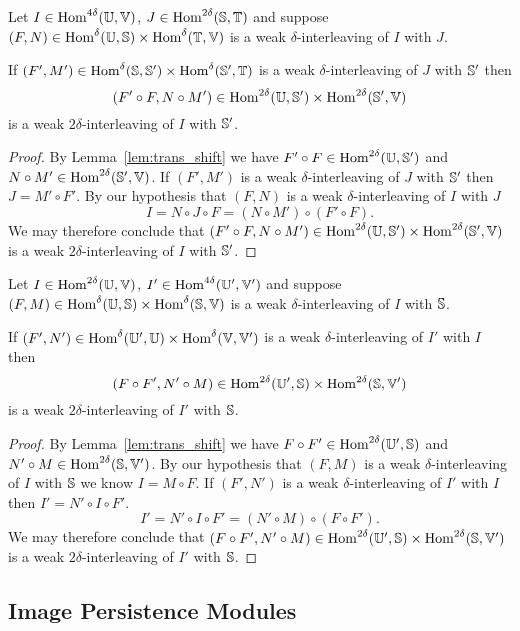 \begin{lemma}\label{lem:left}
  Let $I\in\Hom^{4\delta}(\U,\V)$, $J\in\Hom^{2\delta}(\S,\T)$ and suppose $(F, N)\in\Hom^{\delta}(\U,\S)\times\Hom^\delta(\T,\V)$ is a weak $\delta$-interleaving of $I$ with $J$.

  If $(F', M')\in\Hom^\delta(\S,\S')\times\Hom^\delta(\S',\T)$ is a weak $\delta$-interleaving of $J$ with $\S'$ then
  \[(F'\circ F, N\circ M')\in\Hom^{2\delta}(\U,\S')\times \Hom^{2\delta}(\S',\V)\]
  is a weak $2\delta$-interleaving of $I$ with $\S'$.
\end{lemma}
\begin{proof}
  By Lemma~\ref{lem:trans_shift} we have $F'\circ F\in\Hom^{2\delta}(\U,\S')$ and $N\circ M'\in \Hom^{2\delta}(\S',\V)$.
  If $(F', M')$ is a weak $\delta$-interleaving of $J$ with $\S'$ then $J = M'\circ F'$.
  By our hypothesis that $(F, N)$ is a weak $\delta$-interleaving of $I$ with $J$
  \[ I = N\circ J\circ F = (N\circ M')\circ (F'\circ F).\]
  We may therefore conclude that $(F'\circ F, N\circ M')\in\Hom^{2\delta}(\U,\S')\times \Hom^{2\delta}(\S',\V)$ is a weak $2\delta$-interleaving of $I$ with $\S'$.
\end{proof}

\begin{lemma}\label{lem:right}
  Let $I\in\Hom^{2\delta}(\U,\V)$, $I'\in\Hom^{4\delta}(\U',\V')$ and suppose $(F, M)\in\Hom^\delta(\U,\S)\times\Hom^\delta(\S,\V)$ is a weak $\delta$-interleaving of $I$ with $\S$.

  If $(F',N')\in\Hom^\delta(\U',\U)\times\Hom^\delta(\V,\V')$ is a weak $\delta$-interleaving of $I'$ with $I$ then
  \[(F\circ F', N'\circ M)\in\Hom^{2\delta}(\U',\S)\times\Hom^{2\delta}(\S,\V')\]
  is a weak $2\delta$-interleaving of $I'$ with $\S$.
\end{lemma}
\begin{proof}
  By Lemma~\ref{lem:trans_shift} we have $F\circ F'\in \Hom^{2\delta}(\U',\S)$ and $N'\circ M\in \Hom^{2\delta}(\S,\V')$.
  By our hypothesis that $(F, M)$ is a weak $\delta$-interleaving of $I$ with $\S$ we know $I = M\circ F$.
  If $(F',N')$ is a weak $\delta$-interleaving of $I'$ with $I$ then $I' = N'\circ I\circ F'$.
  \[ I' = N'\circ I\circ F' = (N'\circ M)\circ (F\circ F').\]
  We may therefore conclude that $(F\circ F', N'\circ M)\in\Hom^{2\delta}(\U',\S)\times\Hom^{2\delta}(\S,\V')$ is a weak $2\delta$-interleaving of $I'$ with $\S$.
\end{proof}

\subsection{Image Persistence Modules}

